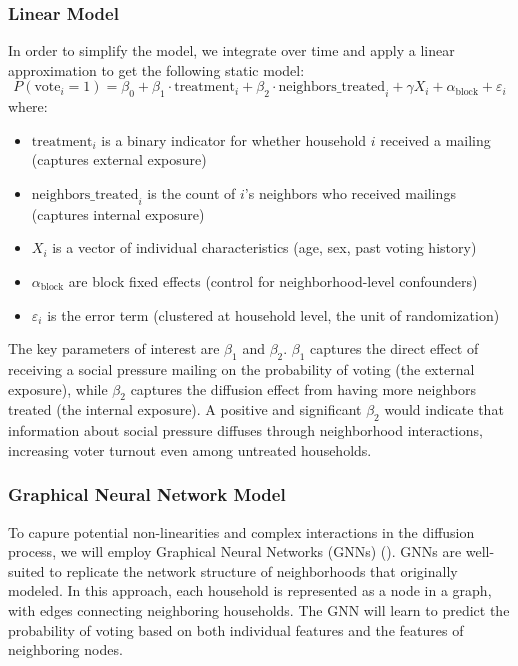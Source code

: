 \documentclass[11pt]{article}
\begin{document}
\subsubsection{Linear Model}
In order to simplify the model, we integrate over time and apply a linear approximation to get the following static model:
\begin{equation*}
    P(\text{vote}_i = 1) = \beta_0 + \beta_1 \cdot \text{treatment}_i + \beta_2 \cdot \text{neighbors\_treated}_i + \gamma X_i + \alpha_{\text{block}} + \varepsilon_i
\end{equation*}
where:
\begin{itemize}[noitemsep]
    \item $\text{treatment}_i$ is a binary indicator for whether household $i$ received a mailing (captures external exposure)
    \item $\text{neighbors\_treated}_i$ is the count of $i$'s neighbors who received mailings (captures internal exposure)
    \item $X_i$ is a vector of individual characteristics (age, sex, past voting history)
    \item $\alpha_{\text{block}}$ are block fixed effects (control for neighborhood-level confounders)
    \item $\varepsilon_i$ is the error term (clustered at household level, the unit of randomization)
\end{itemize}


The key parameters of interest are $\beta_1$ and $\beta_2$. $\beta_1$ captures the direct effect of receiving a social pressure mailing on the probability of voting (the external exposure), while $\beta_2$ captures the diffusion effect from having more neighbors treated (the internal exposure). A positive and significant $\beta_2$ would indicate that information about social pressure diffuses through neighborhood interactions, increasing voter turnout even among untreated households.

\subsubsection{Graphical Neural Network Model}
To capure potential non-linearities and complex interactions in the diffusion process, we will employ Graphical Neural Networks (GNNs) (\cite{kipf_semi-supervised_2017}). GNNs are well-suited to replicate the network structure of neighborhoods that \cite{myers_information_2012} originally modeled. In this approach, each household is represented as a node in a graph, with edges connecting neighboring households. The GNN will learn to predict the probability of voting based on both individual features and the features of neighboring nodes.
\end{document}
